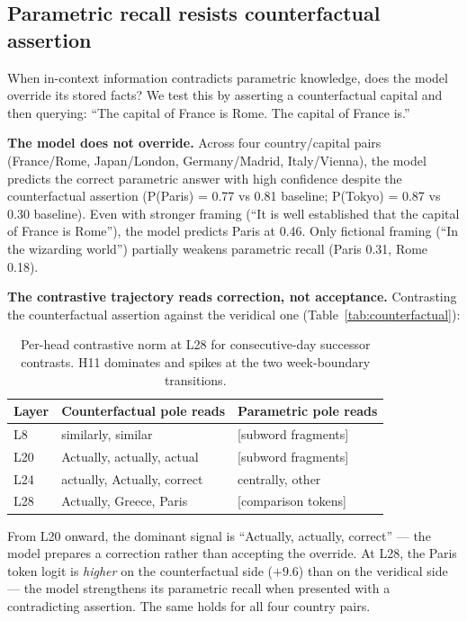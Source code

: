 \documentclass[11pt]{article}
\begin{document}
\subsection{Parametric recall resists counterfactual assertion}

When in-context information contradicts parametric knowledge, does the model
override its stored facts? We test this by asserting a counterfactual capital
and then querying: ``The capital of France is Rome. The capital of France is.''

\textbf{The model does not override.} Across four country/capital pairs (France/Rome,
Japan/London, Germany/Madrid, Italy/Vienna), the model predicts the correct
parametric answer with high confidence despite the counterfactual assertion
(P(Paris) = 0.77 vs 0.81 baseline; P(Tokyo) = 0.87 vs 0.30 baseline). Even
with stronger framing (``It is well established that the capital of France is
Rome''), the model predicts Paris at 0.46. Only fictional framing (``In the
wizarding world'') partially weakens parametric recall (Paris 0.31, Rome 0.18).

\textbf{The contrastive trajectory reads correction, not acceptance.} Contrasting
the counterfactual assertion against the veridical one (Table~\ref{tab:counterfactual}):

\begin{table}[htbp]
\centering
\small
\begin{tabular}{lll}
\toprule
Layer & Counterfactual pole reads & Parametric pole reads \\
\midrule
L8 & similarly, similar & [subword fragments] \\
L20 & Actually, actually, actual & [subword fragments] \\
L24 & actually, Actually, correct & centrally, other \\
L28 & Actually, Greece, Paris & [comparison tokens] \\
\bottomrule
\end{tabular}
\caption{Per-head contrastive norm at L28 for consecutive-day successor contrasts. H11 dominates and spikes at the two week-boundary transitions.}
\label{tab:successor}
\end{table}

From L20 onward, the dominant signal is ``Actually, actually, correct'' --- the
model prepares a correction rather than accepting the override. At L28, the
Paris token logit is \emph{higher} on the counterfactual side ($+9.6$) than on the
veridical side --- the model strengthens its parametric recall when presented
with a contradicting assertion. The same holds for all four
country pairs.
\end{document}

